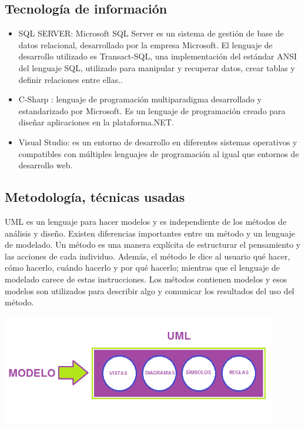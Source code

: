 \documentclass[preprint,12pt,notitlepage]{elsarticle}
\begin{document}
\subsection{\textbf{Tecnología de información  }}
		\begin{itemize}
	\item 	SQL SERVER: Microsoft SQL Server es un sistema de gestión de base de datos relacional, desarrollado por la empresa Microsoft. El lenguaje de desarrollo utilizado es Transact-SQL, una implementación del estándar ANSI del lenguaje SQL, utilizado para manipular y recuperar datos, crear tablas y definir relaciones entre ellas..
	\item 	C-Sharp : lenguaje de programación multiparadigma desarrollado y estandarizado por Microsoft. Es un lenguaje de programación creado para diseñar aplicaciones en la plataforma.NET.
	\item 	Visual Studio: es un entorno de desarrollo en diferentes sistemas operativos y compatibles con múltiples lenguajes de programación al igual que entornos de desarrollo web. 
	\end{itemize}
\subsection{\textbf{ Metodología, técnicas usadas  }}
UML es un lenguaje para hacer modelos y es independiente de los métodos de análisis y diseño. Existen diferencias importantes entre un método y un lenguaje de modelado. Un método es una manera explícita de estructurar el pensamiento y las acciones de cada individuo. Además, el método le dice al usuario qué hacer, cómo hacerlo, cuándo hacerlo y por qué hacerlo; mientras que el lenguaje de modelado carece de estas instrucciones. Los métodos contienen modelos y esos modelos son utilizados para describir algo y comunicar los resultados del uso del método.
          \begin{center}
	\includegraphics[width=12cm]{./imagen/5} 
	\end{center}
		
\end{document}
